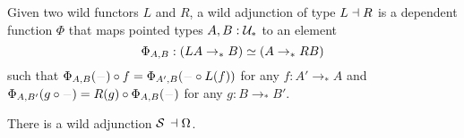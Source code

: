 \documentclass[english,a4]{article}
\newcommand{\ptdto}{\to_\ast}%
\newcommand{\UUptd}{\UU_{\ast}}
\begin{document}
\begin{definition}
  Given two wild functors $L$ and $R$, a wild adjunction of type $L\dashv
  R$ is a dependent function $\Phi$ that maps pointed types $A,B:\UUptd$
  to an element
  \begin{displaymath}
    \Phi_{A,B} : (LA\ptdto B) \weq (A\ptdto RB)
  \end{displaymath}
  such that $\Phi_{A,B}(\blank) \circ f = \Phi_{A',B} (\blank \circ L(f))$ for
  any $f:A'\ptdto A$ and $\Phi_{A,B'}(g\circ\blank) = R(g)\circ \Phi_{A,B}
  (\blank)$ for any $g:B\ptdto B'$.
  \label{def:wild-adj}
\end{definition}

\begin{proposition}
  There is a wild adjunction $\susp \null \leftadjto \loopspace \null$.
  \label{prop:susp-loop-adjunction}
\end{proposition}
\end{document}
